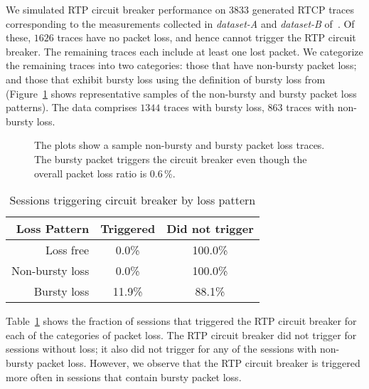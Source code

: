 We simulated RTP circuit breaker performance on $3833$ generated RTCP traces
corresponding to the measurements collected in \emph{dataset-A} and
\emph{dataset-B} of~\cite{ellis:2011:dataset}. Of these, $1626$ traces have no
packet loss, and hence cannot trigger the RTP circuit breaker. The remaining
traces each include at least one lost packet. We categorize the remaining
traces into two categories: those that have non-bursty packet loss; and those
that exhibit bursty loss using the definition of bursty loss
from~\cite{rfc3611} (Figure~\ref{fig:bursty} shows representative samples of
the non-bursty and bursty packet loss patterns). The data comprises $1344$
traces with bursty loss, $863$ traces with non-bursty loss.

\begin{figure}
  \centerline{
  }
  \caption{The plots show a sample non-bursty and bursty packet loss traces.
  The bursty packet triggers the circuit breaker even though the overall
  packet loss ratio is 0.6\,\%.}
  \label{fig:bursty}
\end{figure}

\begin{table}
  \begin{center}
    \begin{tabular}{rcc}
    \toprule
    Loss Pattern       & Triggered & Did not trigger \\
    \midrule
             Loss free &   0.0\% & 100.0\% \\
       Non-bursty loss &   0.0\% & 100.0\% \\
          Bursty loss  &  11.9\% &  88.1\% \\
    \bottomrule
    \end{tabular}
    \caption{Sessions triggering circuit breaker by loss pattern}
    \label{tab:cb_bursty}
  \end{center}
\end{table}



Table~\ref{tab:cb_bursty} shows the fraction of sessions that triggered the
RTP circuit breaker for each of the categories of packet loss. The RTP circuit
breaker did not trigger for sessions without loss; it also did not trigger for
any of the sessions with non-bursty packet loss. However, we observe that the
RTP circuit breaker is triggered more often in sessions that contain bursty
packet loss. 

